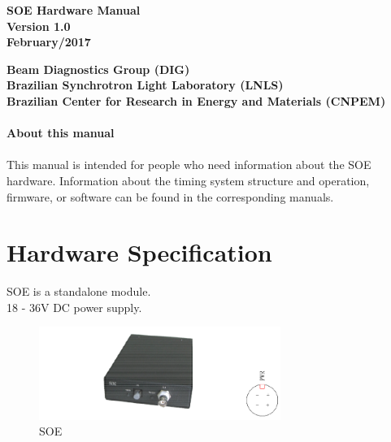 \documentclass[openany]{article}
\begin{document}
\begin{titlepage}

\thispagestyle{fancy}

\begin{center}

\vspace*{\fill}
\textbf{\Huge SOE Hardware Manual}\\[20pt]
\textbf{\Huge Version 1.0}\\[20pt]
\textbf{\Huge February/2017}
\vspace*{\fill}

\vfill
\textbf{Beam Diagnostics Group (DIG)}\\[5pt]
\textbf{Brazilian Synchrotron Light Laboratory (LNLS)}\\[5pt]
\textbf{Brazilian Center for Research in Energy and Materials (CNPEM)}
\end{center}

\end{titlepage}

\newpage
\pagestyle{plain}

\paragraph{}{\Large\bfseries About this manual}

\paragraph{} This manual is intended for people who need information about the SOE hardware. Information about the timing system structure and operation, firmware, or software can be found in the corresponding manuals.

\tableofcontents

\newpage
\section{Hardware Specification}

\par SOE is a standalone module. \\ 18 - 36V DC power supply.

\begin{figure}[!h]
\caption{SOE}
\label{fig:soe}
\centering
\includegraphics[width=0.7\textwidth]{soe-image}
\end{figure}
\end{document}
